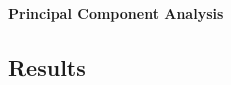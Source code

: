 \documentclass[a4paper]{article}
\begin{document}
\vspace{1cm}

{\textbf{Principal Component Analysis}} \\
 
 
\subsection{Results}

%
%
%

 

%
%
\end{document}
